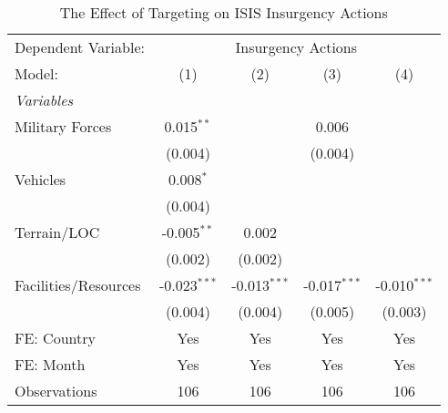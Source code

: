  \begin{table}[htbp]
    \caption{The Effect of Targeting on ISIS Insurgency Actions}
    \centering
    \begin{tabular}{lcccc}
       \tabularnewline \midrule \midrule
       Dependent Variable: & \multicolumn{4}{c}{Insurgency Actions}\\
       Model:                 & (1)             & (2)             & (3)             & (4)\\
       \midrule
       \emph{Variables}\\
       Military Forces       & 0.015$^{**}$   &                 & 0.006          &   \\
                              & (0.004)        &                 & (0.004)        &   \\
       Vehicles               & 0.008$^{*}$   &                 &                 &   \\
                              & (0.004)        &                 &                 &   \\
       Terrain/LOC           & -0.005$^{**}$         & 0.002          &                 &   \\
                              & (0.002)        & (0.002)        &                 &   \\   
       Facilities/Resources  & -0.023$^{***}$ & -0.013$^{***}$ & -0.017$^{***}$ & -0.010$^{***}$\\
                              & (0.004)        & (0.004)        & (0.005)        & (0.003)\\
       \midrule
       FE: Country                & Yes             & Yes             & Yes             & Yes\\
       FE: Month                  & Yes             & Yes             & Yes             & Yes\\
       Observations           & 106             & 106             & 106             & 106\\
       \midrule
    \end{tabular}
\end{table}


